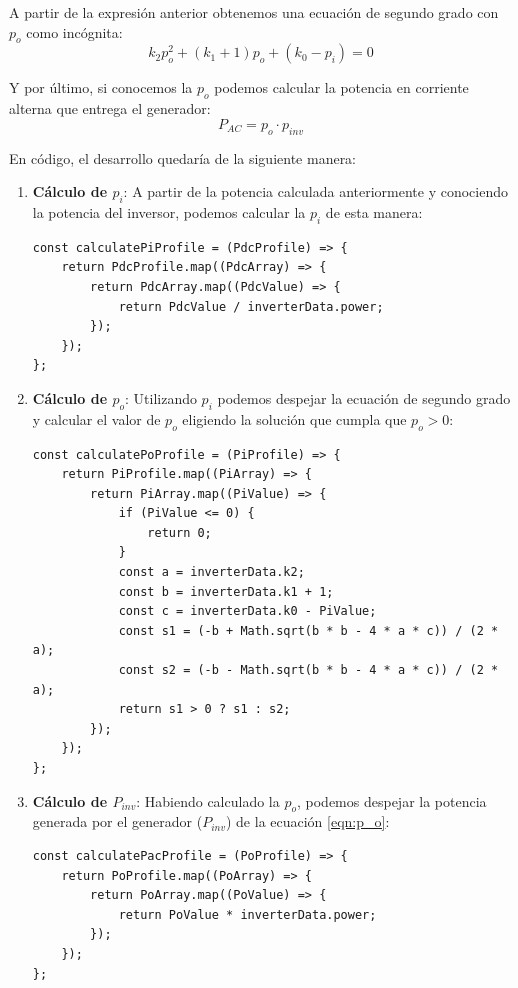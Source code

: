 A partir de la expresión anterior obtenemos una ecuación de segundo grado con $p_o$ como incógnita:
\begin{equation}
k_2p_o^2 + (k_1 + 1)p_o + (k_0 - p_i) = 0
\end{equation}

Y por último, si conocemos la $p_o$ podemos calcular la potencia en corriente alterna que entrega el generador:
\begin{equation}
\label{eqn:P_AC}
P_{AC} = p_o \cdot p_{inv}
\end{equation}

En código, el desarrollo quedaría de la siguiente manera:

\begin{enumerate}
\item \textbf{Cálculo de $p_i$}: A partir de la potencia calculada anteriormente y conociendo la potencia del inversor, podemos calcular la $p_i$ de esta manera:

\begin{lstlisting}[style=ES6, caption={Cálculo de $p_i$}]
const calculatePiProfile = (PdcProfile) => {
	return PdcProfile.map((PdcArray) => {
		return PdcArray.map((PdcValue) => {
			return PdcValue / inverterData.power;
		});
	});
};
\end{lstlisting}

\item \textbf{Cálculo de $p_o$}: Utilizando $p_i$ podemos despejar la ecuación de segundo grado y calcular el valor de $p_o$ eligiendo la solución que cumpla que $p_o > 0$:

\begin{lstlisting}[style=ES6, caption={Cálculo de $p_o$}]
const calculatePoProfile = (PiProfile) => {
	return PiProfile.map((PiArray) => {
		return PiArray.map((PiValue) => {
			if (PiValue <= 0) {
				return 0;
			}
			const a = inverterData.k2;
			const b = inverterData.k1 + 1;
			const c = inverterData.k0 - PiValue;
			const s1 = (-b + Math.sqrt(b * b - 4 * a * c)) / (2 * a);
			const s2 = (-b - Math.sqrt(b * b - 4 * a * c)) / (2 * a);
			return s1 > 0 ? s1 : s2;
		});
	});
};
\end{lstlisting}
\newpage

\item \textbf{Cálculo de $P_{inv}$}: Habiendo calculado la $p_o$, podemos despejar la potencia generada por el generador ($P_{inv}$) de la ecuación \ref{eqn:p_o}:

\begin{lstlisting}[style=ES6, caption={Cálculo de $P_{AC}$}]
const calculatePacProfile = (PoProfile) => {
	return PoProfile.map((PoArray) => {
		return PoArray.map((PoValue) => {
			return PoValue * inverterData.power;
		});
	});
};
\end{lstlisting}



\end{enumerate}
